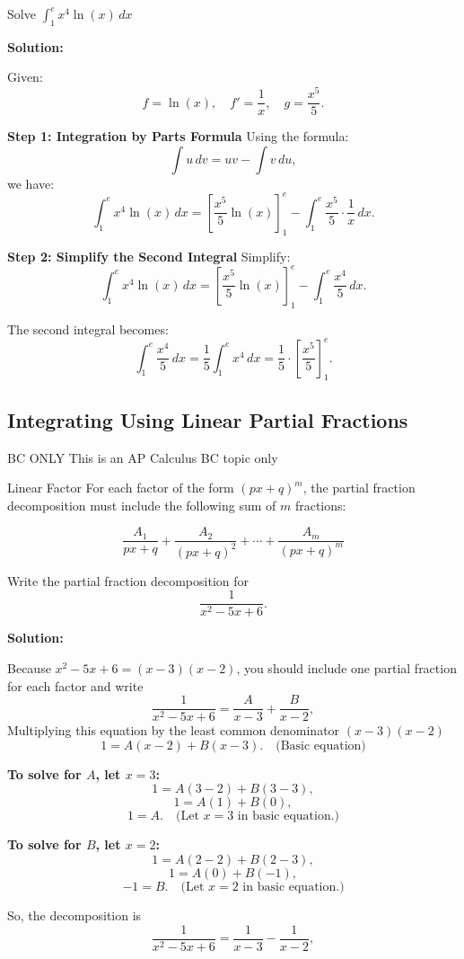 \documentclass[12pt]{article}
\theoremstyle{beautifulthm}
\begin{document}
\begin{tcolorbox}[colback=examplebg, colframe=red!75!black, title=\textbf{EXAMPLE 3: Find the Integral of the Function}, fonttitle=\bfseries, sharp corners]
Solve \( \int_1^e x^4 \ln(x) \, dx \)


\tcblower
\textbf{Solution:} 

Given:
\[
f = \ln(x), \quad f' = \frac{1}{x}, \quad g = \frac{x^5}{5}.
\]

\textbf{Step 1: Integration by Parts Formula}
Using the formula:
\[
\int u \, dv = uv - \int v \, du,
\]
we have:
\[
\int_1^e x^4 \ln(x) \, dx = \left[\frac{x^5}{5} \ln(x)\right]_1^e - \int_1^e \frac{x^5}{5} \cdot \frac{1}{x} \, dx.
\]

\textbf{Step 2: Simplify the Second Integral}
Simplify:
\[
\int_1^e x^4 \ln(x) \, dx = \left[\frac{x^5}{5} \ln(x)\right]_1^e - \int_1^e \frac{x^4}{5} \, dx.
\]

The second integral becomes:
\[
\int_1^e \frac{x^4}{5} \, dx = \frac{1}{5} \int_1^e x^4 \, dx = \frac{1}{5} \cdot \left[\frac{x^5}{5}\right]_1^e.
\]
\end{tcolorbox}


\newpage

\subsection{Integrating Using Linear Partial Fractions}
\begin{Note}{BC ONLY}{}
    This is an AP Calculus BC topic only
\end{Note}
\begin{mytheorem}{Linear Factor}{}
For each factor of the form $(px + q)^m$, the partial fraction decomposition must include the following sum of $m$ fractions:

\[
\frac{A_1}{px + q} + \frac{A_2}{(px + q)^2} + \cdots + \frac{A_m}{(px + q)^m}
\]
\end{mytheorem}

\begin{tcolorbox}[colback=examplebg, colframe=red!75!black, title=\textbf{EXAMPLE 1: Distinct Linear Factors}, fonttitle=\bfseries, sharp corners]
Write the partial fraction decomposition for
\[
\frac{1}{x^2 - 5x + 6}.
\]


\tcblower
\textbf{Solution:} 

Because $x^2 - 5x + 6 = (x - 3)(x - 2)$, you should include one partial fraction for each factor and write
\[
\frac{1}{x^2 - 5x + 6} = \frac{A}{x - 3} + \frac{B}{x - 2},
\]
Multiplying this equation by the least common denominator $(x - 3)(x - 2)$ 
\[
1 = A(x - 2) + B(x - 3). \quad \text{(Basic equation)}
\]

\textbf{To solve for $A$, let $x = 3$:}
\[
1 = A(3 - 2) + B(3 - 3),
\]
\[
1 = A(1) + B(0),
\]
\[
1 = A. \quad \text{(Let $x = 3$ in basic equation.)}
\]

\textbf{To solve for $B$, let $x = 2$:}
\[
1 = A(2 - 2) + B(2 - 3),
\]
\[
1 = A(0) + B(-1),
\]
\[
-1 = B. \quad \text{(Let $x = 2$ in basic equation.)}
\]

So, the decomposition is
\[
\frac{1}{x^2 - 5x + 6} = \frac{1}{x - 3} - \frac{1}{x - 2},
\]


\end{tcolorbox}
    
\end{document}
